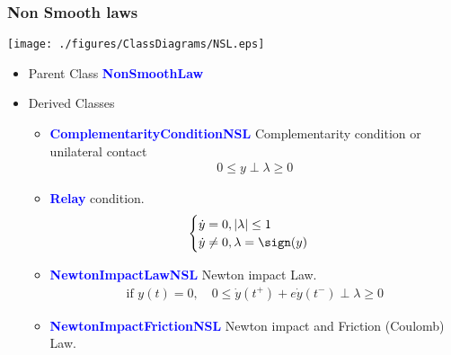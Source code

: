 {
\frametitle{Non Smooth laws}
 \begin{center}\texttt{[image: ./figures/ClassDiagrams/NSL.eps]}\end{center}
\begin{itemize}
\item Parent Class \textcolor{blue}{\textbf{NonSmoothLaw}} 
\item Derived Classes
  \begin{itemize}
  \item \textcolor{blue}{\textbf{ComplementarityConditionNSL}} Complementarity condition or unilateral contact
    \begin{eqnarray*}
      0 \leq y \perp \lambda\geq 0
    \end{eqnarray*}
  \item \textcolor{blue}{\textbf{Relay}} condition.
    \begin{eqnarray*}
      \begin{cases}
        \dot y =0, |\lambda | \leq 1\\
        \dot y \neq 0, \lambda =  \sign( y )\\
      \end{cases}    
    \end{eqnarray*}
  \item \textcolor{blue}{\textbf{NewtonImpactLawNSL}}  Newton impact Law.
    \begin{eqnarray*}
      \label{eq:13}
      \text{if } y(t)=0,\quad   0 \leq \dot y(t^+) +e   \dot y(t^-) \perp \lambda\geq 0
    \end{eqnarray*}
  \item  \textcolor{blue}{\textbf{NewtonImpactFrictionNSL}}  Newton impact and Friction (Coulomb) Law.
  \end{itemize}
\end{itemize}
}


